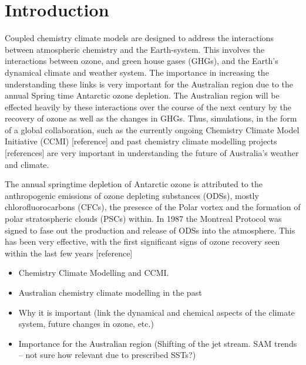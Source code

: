 \section{Introduction} 

Coupled chemistry climate models are designed to address the interactions between atmospheric chemistry and the Earth-system. This involves the interactions between ozone, and green house gases (GHGs), and the Earth's dynamical climate and weather system. The importance in increasing the understanding these links is very important for the Australian region due to the annual Spring time Antarctic ozone depletion. The Australian region will be effected heavily by these interactions over the course of the next century by the recovery of ozone as well as the changes in GHGs. Thus, simulations, in the form of a global collaboration, such as the currently ongoing Chemistry Climate Model Initiative (CCMI) [reference] and past chemistry climate modelling projects [references] are very important in understanding the future of Australia's weather and climate.

The annual springtime depletion of Antarctic ozone is attributed to the anthropogenic emissions of ozone depleting substances (ODSs), mostly chlorofluorocarbons (CFCs), the presesce of the Polar vortex and the formation of polar stratospheric clouds (PSCs) within. In 1987 the Montreal Protocol was signed to fase out the production and release of ODSs into the atmosphere. This has been very effective, with the first significant signs of ozone recovery seen within the last few years [reference] 

\begin{itemize}
\item Chemistry Climate Modelling and CCMI.
\item Australian chemistry climate modelling in the past
\item Why it is important (link the dynamical and chemical aspects of the climate system, future changes in ozone, etc.)
\item Importance for the Australian region (Shifting of the jet stream. SAM trends – not sure how relevant due to prescribed SSTs?)
\end{itemize}